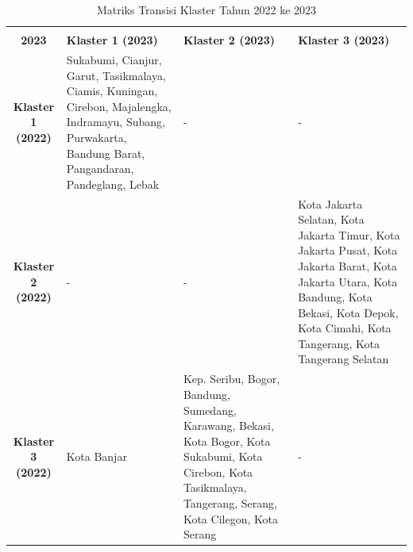 \begin{table}[H]
\centering
\caption{Matriks Transisi Klaster Tahun 2022 ke 2023} \label{tab:transisi_2022_2023}
\begin{tabular}{|c|p{2cm}|p{2cm}|p{2cm}|}
\hline
\makecell{\textbf{Tahun 2022} \\ \textbf{2023}} & \textbf{Klaster 1 (2023)} & \textbf{Klaster 2 (2023)} & \textbf{Klaster 3 (2023)} \\ \hline
\textbf{Klaster 1 (2022)} & Sukabumi, Cianjur, Garut, Tasikmalaya, Ciamis, Kuningan, Cirebon, Majalengka, Indramayu, Subang, Purwakarta, Bandung Barat, Pangandaran, Pandeglang, Lebak & - & - \\ \hline
\textbf{Klaster 2 (2022)} & - & - & Kota Jakarta Selatan, Kota Jakarta Timur, Kota Jakarta Pusat, Kota Jakarta Barat, Kota Jakarta Utara, Kota Bandung, Kota Bekasi, Kota Depok, Kota Cimahi, Kota Tangerang, Kota Tangerang Selatan \\ \hline
\textbf{Klaster 3 (2022)} & Kota Banjar & Kep. Seribu, Bogor, Bandung, Sumedang, Karawang, Bekasi, Kota Bogor, Kota Sukabumi, Kota Cirebon, Kota Tasikmalaya, Tangerang, Serang, Kota Cilegon, Kota Serang & - \\ \hline
\end{tabular}
\end{table}